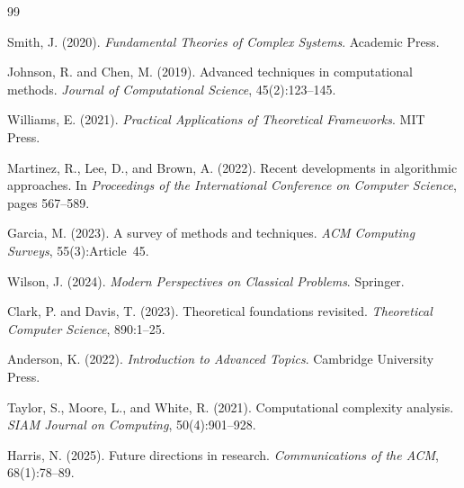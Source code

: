 \documentclass[11pt,twoside,openright]{book}
\theoremstyle{plain}
\theoremstyle{definition}
\theoremstyle{remark}
\begin{document}
\begin{thebibliography}{99}

Smith, J. (2020).
\newblock \emph{Fundamental Theories of Complex Systems}. Academic Press.

Johnson, R. and Chen, M. (2019).
\newblock Advanced techniques in computational methods.
\newblock \emph{Journal of Computational Science}, 45(2):123--145.

Williams, E. (2021).
\newblock \emph{Practical Applications of Theoretical Frameworks}. MIT Press.

Martinez, R., Lee, D., and Brown, A. (2022).
\newblock Recent developments in algorithmic approaches.
\newblock In \emph{Proceedings of the International Conference on Computer Science}, pages 567--589.

Garcia, M. (2023).
\newblock A survey of methods and techniques.
\newblock \emph{ACM Computing Surveys}, 55(3):Article~45.

Wilson, J. (2024).
\newblock \emph{Modern Perspectives on Classical Problems}. Springer.

Clark, P. and Davis, T. (2023).
\newblock Theoretical foundations revisited.
\newblock \emph{Theoretical Computer Science}, 890:1--25.

Anderson, K. (2022).
\newblock \emph{Introduction to Advanced Topics}. Cambridge University Press.

Taylor, S., Moore, L., and White, R. (2021).
\newblock Computational complexity analysis.
\newblock \emph{SIAM Journal on Computing}, 50(4):901--928.

Harris, N. (2025).
\newblock Future directions in research.
\newblock \emph{Communications of the ACM}, 68(1):78--89.

\end{thebibliography}

\printindex
\end{document}
